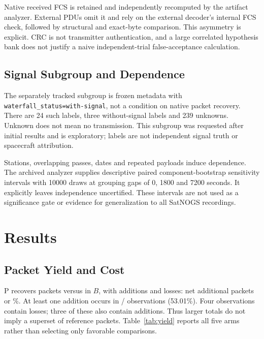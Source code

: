 \documentclass[journal]{IEEEtran}
\newcommand{\code}[1]{\texttt{#1}}
\begin{document}
Native received FCS is retained and independently recomputed by the artifact analyzer. External PDUs omit it and rely on the external decoder's internal FCS check, followed by structural and exact-byte comparison. This asymmetry is explicit. CRC is not transmitter authentication, and a large correlated hypothesis bank does not justify a naive independent-trial false-acceptance calculation.

\subsection{Signal Subgroup and Dependence}
The separately tracked subgroup is frozen metadata with \code{waterfall\_status=with-signal}, not a condition on native packet recovery. There are 24 such labels, three without-signal labels and 239 unknowns. Unknown does not mean no transmission. This subgroup was requested after initial results and is exploratory; labels are not independent signal truth or spacecraft attribution.

Stations, overlapping passes, dates and repeated payloads induce dependence. The archived analyzer supplies descriptive paired component-bootstrap sensitivity intervals with 10000 draws at grouping gaps of 0, 1800 and 7200 seconds. It explicitly leaves independence uncertified. These intervals are not used as a significance gate or evidence for generalization to all SatNOGS recordings.

\section{Results}
\subsection{Packet Yield and Cost}
\begin{table}[t]
\caption{Complete historical replay: observation-level unique PDUs and final process wall sums. Concurrent-host timings exclude shared conversion; they are not campaign elapsed time.}
\label{tab:yield}
\centering\footnotesize

\end{table}

P recovers \Ours{} packets versus \Reference{} in $B$, with \Added{} additions and \Lost{} losses: \Net{} net additional packets or \NetPercent\%. At least one addition occurs in \GainObservations{}/\StudyN{} observations (53.01\%). Four observations contain losses; three of these also contain additions. Thus larger totals do not imply a superset of reference packets. Table~\ref{tab:yield} reports all five arms rather than selecting only favorable comparisons.
\end{document}
